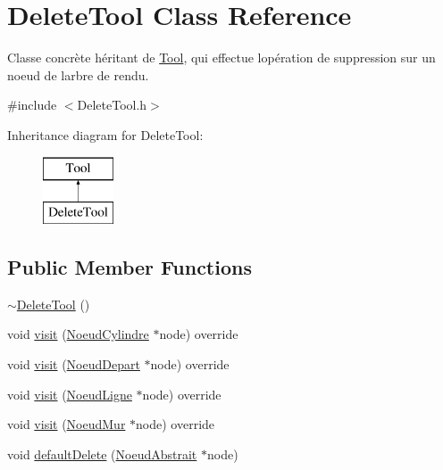 \hypertarget{class_delete_tool}{}\section{Delete\+Tool Class Reference}
\label{class_delete_tool}


Classe concrète héritant de \hyperlink{class_tool}{Tool}, qui effectue l\textquotesingle{}opération de suppression sur un noeud de l\textquotesingle{}arbre de rendu.  




{\ttfamily \#include $<$Delete\+Tool.\+h$>$}

Inheritance diagram for Delete\+Tool\+:\begin{figure}[H]
\begin{center}
\leavevmode
\includegraphics[height=2.000000cm]{class_delete_tool}
\end{center}
\end{figure}
\subsection*{Public Member Functions}
\begin{DoxyCompactItemize}
\item 
\hyperlink{group__inf2990_ga4a54f710ae3ca5e4eb8e16610d07c3bc}{$\sim$\+Delete\+Tool} ()
\item 
void \hyperlink{group__inf2990_gaf91f134881ce52596486855f405e8f96}{visit} (\hyperlink{class_noeud_cylindre}{Noeud\+Cylindre} $\ast$node) override
\item 
void \hyperlink{group__inf2990_ga9efc126da05a809724a3a2597ac4cb57}{visit} (\hyperlink{class_noeud_depart}{Noeud\+Depart} $\ast$node) override
\item 
void \hyperlink{group__inf2990_gae485844dc100a1cba6294cfbe6675626}{visit} (\hyperlink{class_noeud_ligne}{Noeud\+Ligne} $\ast$node) override
\item 
void \hyperlink{group__inf2990_ga816147276bc393b0552e031441541726}{visit} (\hyperlink{class_noeud_mur}{Noeud\+Mur} $\ast$node) override
\item 
void \hyperlink{group__inf2990_gab16541bc54ef7e060c56d59d64798805}{default\+Delete} (\hyperlink{class_noeud_abstrait}{Noeud\+Abstrait} $\ast$node)
\end{DoxyCompactItemize}


